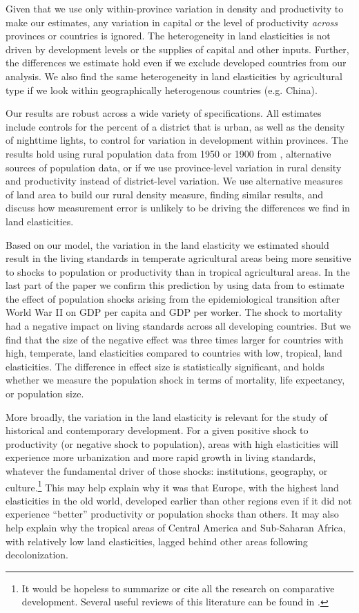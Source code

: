 \documentclass[11pt]{article}
\begin{document}
Given that we use only within-province variation in density and productivity to make our estimates, any variation in capital or the level of productivity \textit{across} provinces or countries is ignored. The heterogeneity in land elasticities is not driven by development levels or the supplies of capital and other inputs. Further, the differences we estimate hold even if we exclude developed countries from our analysis. We also find the same heterogeneity in land elasticities by agricultural type if we look within geographically heterogenous countries (e.g. China).

Our results are robust across a wide variety of specifications. All estimates include controls for the percent of a district that is urban, as well as the density of nighttime lights, to control for variation in development within provinces. The results hold using rural population data from 1950 or 1900 from \cite{hyde31}, alternative sources of population data, or if we use province-level variation in rural density and productivity instead of district-level variation. We use alternative measures of land area to build our rural density measure, finding similar results, and discuss how measurement error is unlikely to be driving the differences we find in land elasticities.

Based on our model, the variation in the land elasticity we estimated should result in the living standards in temperate agricultural areas being more sensitive to shocks to population or productivity than in tropical agricultural areas. In the last part of the paper we confirm this prediction by using data from \cite{aj07} to estimate the effect of population shocks arising from the epidemiological transition after World War II on GDP per capita and GDP per worker. The shock to mortality had a negative impact on living standards across all developing countries. But we find that the size of the negative effect was three times larger for countries with high, temperate, land elasticities compared to countries with low, tropical, land elasticities. The difference in effect size is statistically significant, and holds whether we measure the population shock in terms of mortality, life expectancy, or population size.

More broadly, the variation in the land elasticity is relevant for the study of historical and contemporary development. For a given positive shock to productivity (or negative shock to population), areas with high elasticities will experience more urbanization and more rapid growth in living standards, whatever the fundamental driver of those shocks: institutions, geography, or culture.\footnote{It would be hopeless to summarize or cite all the research on comparative development. Several useful reviews of this literature can be found in \cite{ajr2005handbook,nunn_2009,Galor:2011uq,sw2013,vries2013}.} This may help explain why it was that Europe, with the highest land elasticities in the old world, developed earlier than other regions even if it did not experience ``better'' productivity or population shocks than others. It may also help explain why the tropical areas of Central America and Sub-Saharan Africa, with relatively low land elasticities, lagged behind other areas following decolonization.
\end{document}
